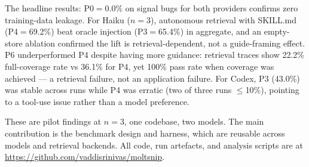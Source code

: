 \documentclass[10pt,a4paper,twocolumn]{article}
\begin{document}
The headline results: P0$=$0.0\% on signal bugs for both providers
confirms zero training-data leakage.
For Haiku ($n{=}3$), autonomous retrieval with SKILL.md
(P4$=$69.2\%) beat oracle injection (P3$=$65.4\%) in aggregate, and an
empty-store ablation confirmed the lift is retrieval-dependent, not a
guide-framing effect.
P6 underperformed P4 despite having more guidance: retrieval traces show
22.2\% full-coverage rate vs 36.1\% for P4, yet 100\% pass rate when
coverage was achieved --- a retrieval failure, not an application failure.
For Codex, P3 (43.0\%) was stable across runs while P4 was erratic
(two of three runs $\leq$10\%), pointing to a tool-use issue rather than
a model preference.

These are pilot findings at $n{=}3$, one codebase, two models.
The main contribution is the benchmark design and harness, which are
reusable across models and retrieval backends.
All code, run artefacts, and analysis scripts are at
\url{https://github.com/vaddisrinivas/moltsnip}.


\end{document}
